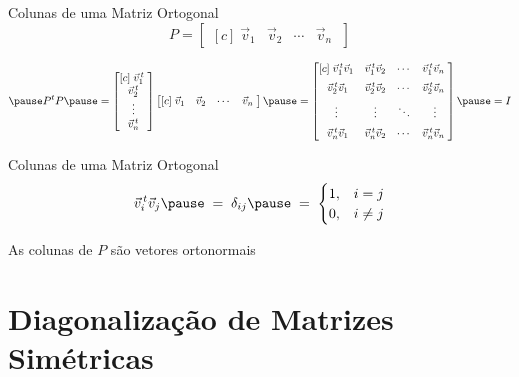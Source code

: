 \documentclass[fleqn,aspectratio=169,12pt]{beamer}
\begin{document}
\begin{frame}{Colunas de uma Matriz Ortogonal}
  \[
    P =
    \begin{bmatrix}[c]
      \; \vec{v}_{1} & \vec{v}_{2} & \cdots & \vec{v}_{n} \;
    \end{bmatrix}
  \]

  \[
    \pause
    P^t P
    \pause
    =
    \begin{bmatrix}[c]
      \;\vec{v}^{\,t}_{1}\; \\
      \vec{v}^{\,t}_{2} \\
      \vdots  \\
      \vec{v}^{\,t}_{n}
    \end{bmatrix}
    \begin{bmatrix}[c]
      \; \vec{v}_{1} & \vec{v}_{2} & \cdots & \vec{v}_{n} \; \\
    \end{bmatrix}
    \pause
    =
    \begin{bmatrix}[c]
      \; \vec{v}^{\,t}_{1}\vec{v}_{1} & \vec{v}^{\,t}_{1}\vec{v}_{2} & \cdots & \vec{v}^{\,t}_{1}\vec{v}_{n} \; \\[2mm]
      \; \vec{v}^{\,t}_{2}\vec{v}_{1} & \vec{v}^{\,t}_{2}\vec{v}_{2} & \cdots & \vec{v}^{\,t}_{2}\vec{v}_{n} \; \\[2mm]
      \vdots                          & \vdots                       & \ddots & \vdots                          \\[2mm]
      \; \vec{v}^{\,t}_{n}\vec{v}_{1} & \vec{v}^{\,t}_{n}\vec{v}_{2} & \cdots & \vec{v}^{\,t}_{n}\vec{v}_{n} \;
    \end{bmatrix}
    \pause
    = I
  \]
\end{frame}

\begin{frame}{Colunas de uma Matriz Ortogonal}
  \[
    \vec{v}^{\,t}_{i}\vec{v}_{j}
    \pause
    \;=\; \delta_{ij}
    \pause
    \;=\; \begin{cases}
      1, & i = j\\
      0, & i \neq j
    \end{cases}
  \]

  \pause
  As colunas de $P$ são vetores ortonormais
\end{frame}

\section{Diagonalização de Matrizes Simétricas}
\end{document}
